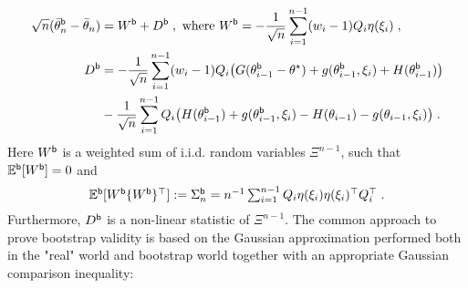 \begin{align}
\label{eq:D_boot-def}
    \sqrt{n}(\bar{\theta}_n^{\mathsf{b}}-\bar{\theta}_{n}) &= W^{\mathsf{b}} + D^{\mathsf{b}} \;,  \text{ where } W^{\mathsf{b}} = -\frac{1}{\sqrt{n}} \sum_{i=1}^{n-1}(w_i-1) Q_{i} \eta(\xi_i) \;, \\
    D^{\mathsf{b}} &= -\frac{1}{\sqrt{n}}\sum_{i=1}^{n-1}(w_i-1) Q_{i}\bigl( G(\theta_{i-1}^{\mathsf{b}}-\theta^\star) + g(\theta_{i-1}^{\mathsf{b}}, \xi_i) + H(\theta_{i-1}^{\mathsf{b}})\bigr) \\&- \frac{1}{\sqrt{n}}\sum_{i=1}^{n-1}Q_i\bigl(H(\theta_{i-1}^{\mathsf{b}}) +g(\theta_{i-1}^{\mathsf{b}}, \xi_i) -  H(\theta_{i-1}) -g(\theta_{i-1}, \xi_i)\bigr)\;. 
\end{align}
Here $W^{\mathsf{b}}$ is a weighted sum of i.i.d. random variables $\Xi^{n-1}$, such that  $\mathbb{E}^{\mathsf{b}}[W^{\mathsf{b}}] = 0$ and 
\begin{equation}
\label{Sigman boot def}
\textstyle 
\mathbb{E}^{\mathsf{b}}[W^{\mathsf{b}} \{W^{\mathsf{b}}\}^{\top}] := \Sigma_{n}^{\mathsf{b}} = n^{-1} \sum_{i=1}^{n-1} Q_i \eta (\xi_i) \eta(\xi_i)^\top Q_i^\top\;.
\end{equation}
Furthermore, $D^{\mathsf{b}}$ is a non-linear statistic of $\Xi^{n-1}$. The common approach to prove bootstrap validity is based on the Gaussian approximation performed both in the "real" world and bootstrap world together with an appropriate Gaussian comparison inequality:


